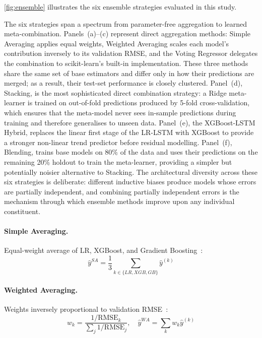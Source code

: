 \documentclass[a4paper,fleqn]{cas-dc}
\begin{document}
\autoref{fig:ensemble} illustrates the six ensemble strategies evaluated in this study.

The six strategies span a spectrum from parameter-free aggregation to learned meta-combination.  Panels~(a)--(c) represent direct aggregation methods: Simple Averaging applies equal weights, Weighted Averaging scales each model's contribution inversely to its validation RMSE, and the Voting Regressor delegates the combination to scikit-learn's built-in implementation.  These three methods share the same set of base estimators and differ only in how their predictions are merged; as a result, their test-set performance is closely clustered.  Panel~(d), Stacking, is the most sophisticated direct combination strategy: a Ridge meta-learner is trained on out-of-fold predictions produced by 5-fold cross-validation, which ensures that the meta-model never sees in-sample predictions during training and therefore generalises to unseen data.  Panel~(e), the XGBoost-LSTM Hybrid, replaces the linear first stage of the LR-LSTM with XGBoost to provide a stronger non-linear trend predictor before residual modelling.  Panel~(f), Blending, trains base models on 80\% of the data and uses their predictions on the remaining 20\% holdout to train the meta-learner, providing a simpler but potentially noisier alternative to Stacking.  The architectural diversity across these six strategies is deliberate: different inductive biases produce models whose errors are partially independent, and combining partially independent errors is the mechanism through which ensemble methods improve upon any individual constituent.

\paragraph{Simple Averaging.} Equal-weight average of LR, XGBoost, and Gradient Boosting~\cite{scikit-learn}:
\begin{equation}
  \hat{y}^{SA} = \frac{1}{3}\sum_{k \in \{LR, XGB, GB\}} \hat{y}^{(k)}
  \label{eq:simple_avg}
\end{equation}

\paragraph{Weighted Averaging.} Weights inversely proportional to validation RMSE~\cite{breiman2001rf}:
\begin{equation}
  w_k = \frac{1/\text{RMSE}_k}{\sum_j 1/\text{RMSE}_j}, \quad \hat{y}^{WA} = \sum_k w_k \hat{y}^{(k)}
  \label{eq:weighted_avg}
\end{equation}
\end{document}
